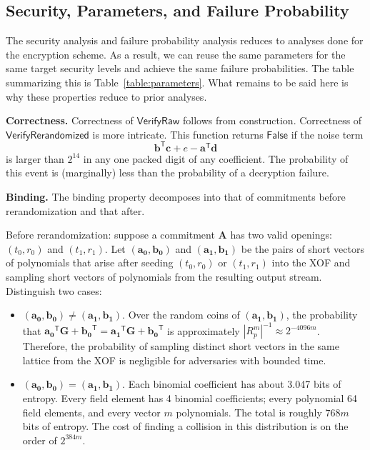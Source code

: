 \subsection{Security, Parameters, and Failure Probability}

The security analysis and failure probability analysis reduces to analyses done for the encryption scheme. As a result, we can reuse the same parameters for the same target security levels and achieve the same failure probabilities. The table summarizing this is Table~\ref{table:parameters}. What remains to be said here is why these properties reduce to prior analyses.

\textbf{Correctness.} Correctness of $\mathsf{VerifyRaw}$ follows from construction. Correctness of $\mathsf{VerifyRerandomized}$ is more intricate. This function returns $\mathsf{False}$ if the noise term
\begin{equation*}
\mathbf{b}^\mathsf{T} \mathbf{c} + e  - \mathbf{a}^\mathsf{T} \mathbf{d}
\end{equation*}
is larger than $2^{14}$ in any one packed digit of any coefficient. The probability of this event is (marginally) less than the probability of a decryption failure.

\textbf{Binding.} The binding property decomposes into that of commitments before rerandomization and that after.

Before rerandomization: suppose a commitment $\mathbf{A}$ has two valid openings: $(t_0, r_0)$ and $(t_1, r_1)$. Let $(\mathbf{a_0}, \mathbf{b_0})$ and $(\mathbf{a_1}, \mathbf{b_1})$ be the pairs of short vectors of polynomials that arise after seeding $(t_0, r_0)$ or $(t_1, r_1)$ into the XOF and sampling short vectors of polynomials from the resulting output stream. Distinguish two cases:
\begin{itemize}
 \item $(\mathbf{a_0}, \mathbf{b_0}) \neq (\mathbf{a_1}, \mathbf{b_1})$. Over the random coins of $(\mathbf{a_1}, \mathbf{b_1})$, the probability that $\mathbf{a_0}^\mathsf{T} \mathbf{G} + \mathbf{b_0}^\mathsf{T} = \mathbf{a_1}^\mathsf{T} \mathbf{G} + \mathbf{b_0}^\mathsf{T}$ is approximately $|R_p^m|^{-1} \approx 2^{-4096m}$. Therefore, the probability of sampling distinct short vectors in the same lattice from the XOF is negligible for adversaries with bounded time.
 \item $(\mathbf{a_0}, \mathbf{b_0}) = (\mathbf{a_1}, \mathbf{b_1})$. Each binomial coefficient has about 3.047 bits of entropy. Every field element has 4 binomial coefficients; every polynomial 64 field elements, and every vector $m$ polynomials. The total is roughly $768 m$ bits of entropy. The cost of finding a collision in this distribution is on the order of $2^{384 m}$.
\end{itemize}

